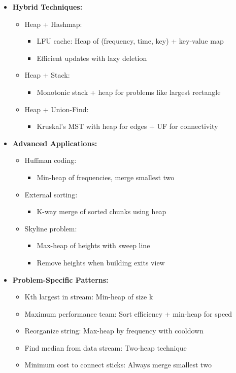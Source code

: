 \documentclass[a4paper,10pt]{book}
\begin{document}
\begin{itemize}
    \item \textbf{Hybrid Techniques:}
    \begin{itemize}
        \item Heap + Hashmap:
        \begin{itemize}
            \item LFU cache: Heap of (frequency, time, key) + key-value map
            \item Efficient updates with lazy deletion
        \end{itemize}
        \item Heap + Stack:
        \begin{itemize}
            \item Monotonic stack + heap for problems like largest rectangle
        \end{itemize}
        \item Heap + Union-Find:
        \begin{itemize}
            \item Kruskal's MST with heap for edges + UF for connectivity
        \end{itemize}
    \end{itemize}
    
    \item \textbf{Advanced Applications:}
    \begin{itemize}
        \item Huffman coding:
        \begin{itemize}
            \item Min-heap of frequencies, merge smallest two
        \end{itemize}
        \item External sorting:
        \begin{itemize}
            \item K-way merge of sorted chunks using heap
        \end{itemize}
        \item Skyline problem:
        \begin{itemize}
            \item Max-heap of heights with sweep line
            \item Remove heights when building exits view
        \end{itemize}
    \end{itemize}
    
    \item \textbf{Problem-Specific Patterns:}
    \begin{itemize}
        \item Kth largest in stream: Min-heap of size k
        \item Maximum performance team: Sort efficiency + min-heap for speed
        \item Reorganize string: Max-heap by frequency with cooldown
        \item Find median from data stream: Two-heap technique
        \label{itm:median}
        \item Minimum cost to connect sticks: Always merge smallest two
    \end{itemize}
    

\end{itemize}
\end{document}
